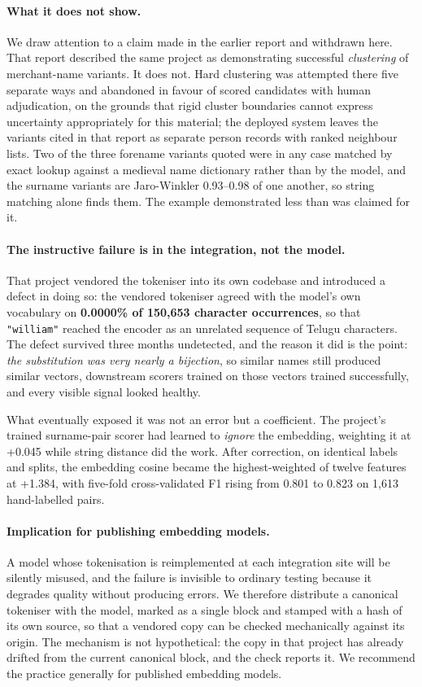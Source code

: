 \documentclass[11pt,a4paper]{article}
\begin{document}
\paragraph{What it does not show.} We draw attention to a claim made in the earlier report and withdrawn here. That report described the same project as demonstrating successful \emph{clustering} of merchant-name variants. It does not. Hard clustering was attempted there five separate ways and abandoned in favour of scored candidates with human adjudication, on the grounds that rigid cluster boundaries cannot express uncertainty appropriately for this material; the deployed system leaves the variants cited in that report as separate person records with ranked neighbour lists. Two of the three forename variants quoted were in any case matched by exact lookup against a medieval name dictionary rather than by the model, and the surname variants are Jaro-Winkler 0.93--0.98 of one another, so string matching alone finds them. The example demonstrated less than was claimed for it.

\paragraph{The instructive failure is in the integration, not the model.} That project vendored the tokeniser into its own codebase and introduced a defect in doing so: the vendored tokeniser agreed with the model's own vocabulary on \textbf{0.0000\% of 150,653 character occurrences}, so that \texttt{"william"} reached the encoder as an unrelated sequence of Telugu characters. The defect survived three months undetected, and the reason it did is the point: \emph{the substitution was very nearly a bijection}, so similar names still produced similar vectors, downstream scorers trained on those vectors trained successfully, and every visible signal looked healthy.

What eventually exposed it was not an error but a coefficient. The project's trained surname-pair scorer had learned to \emph{ignore} the embedding, weighting it at +0.045 while string distance did the work. After correction, on identical labels and splits, the embedding cosine became the highest-weighted of twelve features at +1.384, with five-fold cross-validated F1 rising from 0.801 to 0.823 on 1,613 hand-labelled pairs.

\paragraph{Implication for publishing embedding models.} A model whose tokenisation is reimplemented at each integration site will be silently misused, and the failure is invisible to ordinary testing because it degrades quality without producing errors. We therefore distribute a canonical tokeniser with the model, marked as a single block and stamped with a hash of its own source, so that a vendored copy can be checked mechanically against its origin. The mechanism is not hypothetical: the copy in that project has already drifted from the current canonical block, and the check reports it. We recommend the practice generally for published embedding models.
\end{document}
